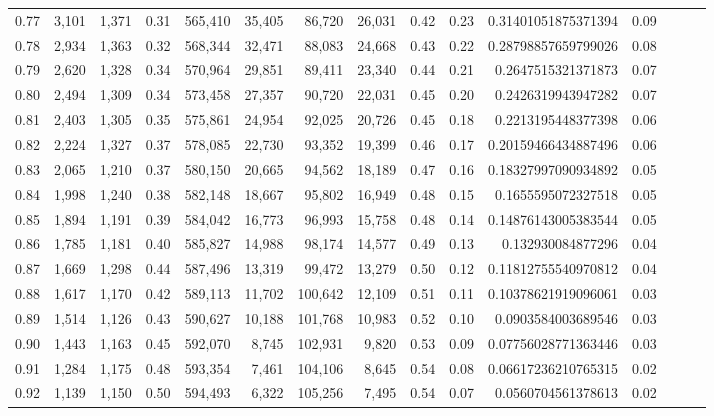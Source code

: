 \begin{tabular}{rrrrrrrrrrrrrrr}
0.77 &   3,101 &  1,371 &  0.31 &  565,410 &   35,405 &   86,720 &   26,031 &  0.42 &  0.23 &   0.31401051875371394 &      0.09 \\
0.78 &   2,934 &  1,363 &  0.32 &  568,344 &   32,471 &   88,083 &   24,668 &  0.43 &  0.22 &   0.28798857659799026 &      0.08 \\
0.79 &   2,620 &  1,328 &  0.34 &  570,964 &   29,851 &   89,411 &   23,340 &  0.44 &  0.21 &    0.2647515321371873 &      0.07 \\
0.80 &   2,494 &  1,309 &  0.34 &  573,458 &   27,357 &   90,720 &   22,031 &  0.45 &  0.20 &    0.2426319943947282 &      0.07 \\
0.81 &   2,403 &  1,305 &  0.35 &  575,861 &   24,954 &   92,025 &   20,726 &  0.45 &  0.18 &    0.2213195448377398 &      0.06 \\
0.82 &   2,224 &  1,327 &  0.37 &  578,085 &   22,730 &   93,352 &   19,399 &  0.46 &  0.17 &   0.20159466434887496 &      0.06 \\
0.83 &   2,065 &  1,210 &  0.37 &  580,150 &   20,665 &   94,562 &   18,189 &  0.47 &  0.16 &   0.18327997090934892 &      0.05 \\
0.84 &   1,998 &  1,240 &  0.38 &  582,148 &   18,667 &   95,802 &   16,949 &  0.48 &  0.15 &    0.1655595072327518 &      0.05 \\
0.85 &   1,894 &  1,191 &  0.39 &  584,042 &   16,773 &   96,993 &   15,758 &  0.48 &  0.14 &   0.14876143005383544 &      0.05 \\
0.86 &   1,785 &  1,181 &  0.40 &  585,827 &   14,988 &   98,174 &   14,577 &  0.49 &  0.13 &     0.132930084877296 &      0.04 \\
0.87 &   1,669 &  1,298 &  0.44 &  587,496 &   13,319 &   99,472 &   13,279 &  0.50 &  0.12 &   0.11812755540970812 &      0.04 \\
0.88 &   1,617 &  1,170 &  0.42 &  589,113 &   11,702 &  100,642 &   12,109 &  0.51 &  0.11 &   0.10378621919096061 &      0.03 \\
0.89 &   1,514 &  1,126 &  0.43 &  590,627 &   10,188 &  101,768 &   10,983 &  0.52 &  0.10 &    0.0903584003689546 &      0.03 \\
0.90 &   1,443 &  1,163 &  0.45 &  592,070 &    8,745 &  102,931 &    9,820 &  0.53 &  0.09 &   0.07756028771363446 &      0.03 \\
0.91 &   1,284 &  1,175 &  0.48 &  593,354 &    7,461 &  104,106 &    8,645 &  0.54 &  0.08 &   0.06617236210765315 &      0.02 \\
0.92 &   1,139 &  1,150 &  0.50 &  594,493 &    6,322 &  105,256 &    7,495 &  0.54 &  0.07 &    0.0560704561378613 &      0.02 \\

\end{tabular}
